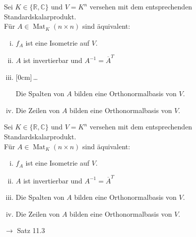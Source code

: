 \documentclass[11pt]{article}
\renewcommand{\cite}[1]{\par\bigskip\hfill{\color{gray}\tiny\(\to\) #1}}
\newcommand{\CC}{\mathbb{C}}
\newcommand{\RR}{\mathbb{R}}
\DeclareMathOperator{\Mat}{Mat}
\newcommand{\hide}[1]{\parbox{0cm}{\raisebox{-7pt}[0cm]{\dots}}\color{white}#1\color{black}}
\let\olddots\dots
\renewcommand{\dots}{\,\olddots\,}
\newenvironment{field}{}{\newpage}
\newif\ifnote
\newenvironment{note}{\notetrue}{\notefalse}
\begin{document}
\begin{note}
    \begin{field}%
        Sei \(K\in\{\RR,\CC\}\) und \(V=K^n\) versehen mit dem entsprechenden Standardskalarprodukt.\\
        Für \(A\in \Mat_K(n\times n)\) sind äquivalent:
        \begin{enumerate}[(i)]
            \item \(f_A\) ist eine Isometrie auf \(V\).
            \item \(A\) ist invertierbar und \(A^{-1}=\overline{A}^T\)
            \item \hide{Die Spalten von \(A\) bilden eine Orthonormalbasis von \(V\).}
            \item Die Zeilen von \(A\) bilden eine Orthonormalbasis von \(V\).
        \end{enumerate}
    \end{field}
    \begin{field}
        Sei \(K\in\{\RR,\CC\}\) und \(V=K^n\) versehen mit dem entsprechenden Standardskalarprodukt.\\
        Für \(A\in \Mat_K(n\times n)\) sind äquivalent:
        \begin{enumerate}[(i)]
            \item \(f_A\) ist eine Isometrie auf \(V\).
            \item \(A\) ist invertierbar und \(A^{-1}=\overline{A}^T\)
            \item Die Spalten von \(A\) bilden eine Orthonormalbasis von \(V\).
            \item Die Zeilen von \(A\) bilden eine Orthonormalbasis von \(V\).
        \end{enumerate}
        \cite{Satz 11.3}
    \end{field}


\end{note}
\end{document}
